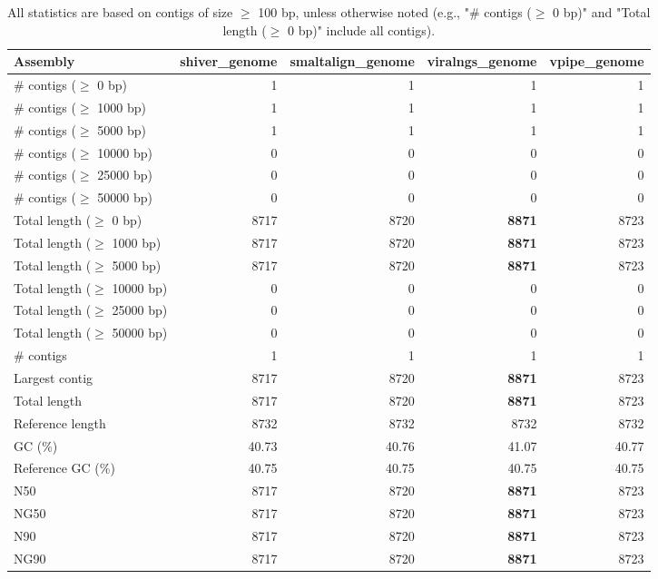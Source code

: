 \documentclass[12pt,a4paper]{article}
\begin{document}
\begin{table}[ht]
\begin{center}
\caption{All statistics are based on contigs of size $\geq$ 100 bp, unless otherwise noted (e.g., "\# contigs ($\geq$ 0 bp)" and "Total length ($\geq$ 0 bp)" include all contigs).}
\begin{tabular}{|l*{4}{|r}|}
\hline
Assembly & shiver\_genome & smaltalign\_genome & viralngs\_genome & vpipe\_genome \\ \hline
\# contigs ($\geq$ 0 bp) & 1 & 1 & 1 & 1 \\ \hline
\# contigs ($\geq$ 1000 bp) & 1 & 1 & 1 & 1 \\ \hline
\# contigs ($\geq$ 5000 bp) & 1 & 1 & 1 & 1 \\ \hline
\# contigs ($\geq$ 10000 bp) & 0 & 0 & 0 & 0 \\ \hline
\# contigs ($\geq$ 25000 bp) & 0 & 0 & 0 & 0 \\ \hline
\# contigs ($\geq$ 50000 bp) & 0 & 0 & 0 & 0 \\ \hline
Total length ($\geq$ 0 bp) & 8717 & 8720 & {\bf 8871} & 8723 \\ \hline
Total length ($\geq$ 1000 bp) & 8717 & 8720 & {\bf 8871} & 8723 \\ \hline
Total length ($\geq$ 5000 bp) & 8717 & 8720 & {\bf 8871} & 8723 \\ \hline
Total length ($\geq$ 10000 bp) & 0 & 0 & 0 & 0 \\ \hline
Total length ($\geq$ 25000 bp) & 0 & 0 & 0 & 0 \\ \hline
Total length ($\geq$ 50000 bp) & 0 & 0 & 0 & 0 \\ \hline
\# contigs & 1 & 1 & 1 & 1 \\ \hline
Largest contig & 8717 & 8720 & {\bf 8871} & 8723 \\ \hline
Total length & 8717 & 8720 & {\bf 8871} & 8723 \\ \hline
Reference length & 8732 & 8732 & 8732 & 8732 \\ \hline
GC (\%) & 40.73 & 40.76 & 41.07 & 40.77 \\ \hline
Reference GC (\%) & 40.75 & 40.75 & 40.75 & 40.75 \\ \hline
N50 & 8717 & 8720 & {\bf 8871} & 8723 \\ \hline
NG50 & 8717 & 8720 & {\bf 8871} & 8723 \\ \hline
N90 & 8717 & 8720 & {\bf 8871} & 8723 \\ \hline
NG90 & 8717 & 8720 & {\bf 8871} & 8723 \\ \hline

\end{tabular}
\end{center}
\end{table}
\end{document}

